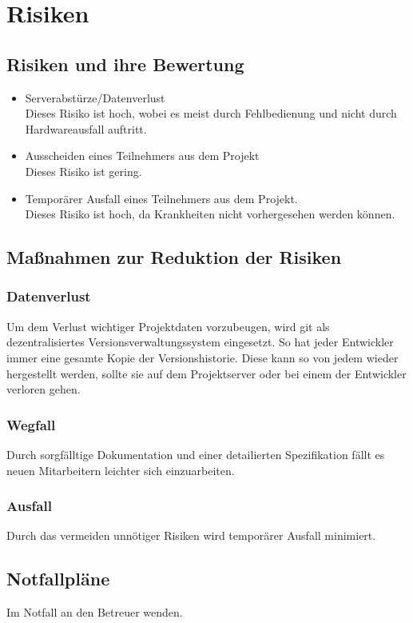 \documentclass[a4paper,10pt]{scrartcl}
\begin{document}
\section{Risiken}
\subsection{Risiken und ihre Bewertung}
\begin{itemize}
\item Serverabstürze/Datenverlust\\
Dieses Risiko ist hoch, wobei es meist durch Fehlbedienung und nicht durch Hardwareausfall auftritt.
\item Ausscheiden eines Teilnehmers aus dem Projekt\\
Dieses Risiko ist gering.
\item Temporärer Ausfall eines Teilnehmers aus dem Projekt.\\
Dieses Risiko ist hoch, da Krankheiten nicht vorhergesehen werden können.
\end{itemize}


\subsection{Maßnahmen zur Reduktion der Risiken}
\subsubsection{Datenverlust}
Um dem Verlust wichtiger Projektdaten vorzubeugen, wird git als dezentralisiertes Versionsverwaltungssystem eingesetzt.
So hat jeder Entwickler immer eine gesamte Kopie der Versionshistorie. Diese kann so von jedem wieder hergestellt werden, sollte sie auf dem Projektserver oder bei einem der Entwickler verloren gehen.
\subsubsection{Wegfall}
Durch sorgfälltige Dokumentation und einer detailierten Spezifikation fällt es neuen Mitarbeitern leichter sich einzuarbeiten.
\subsubsection{Ausfall}
Durch das vermeiden unnötiger Risiken wird temporärer Ausfall minimiert.
\subsection{Notfallpläne}
Im Notfall an den Betreuer wenden.
\end{document}
